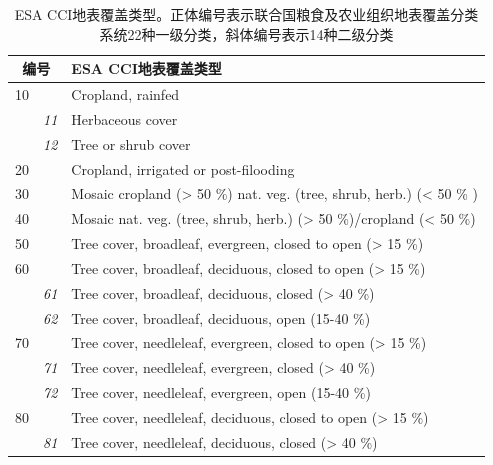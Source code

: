 \begin{table}[htbp]
  \centering
  \caption[ESA CCI地表覆盖类型]{ESA CCI地表覆盖类型。正体编号表示联合国粮食及农业组织地表覆盖分类系统22种一级分类，斜体编号表示14种二级分类}
  \label{tab:ESA覆盖类型}
  \begin{tabular}{lll}
    \toprule
    \multicolumn{2}{c}{编号} & ESA CCI地表覆盖类型 \\ \midrule
    10                       &                      & Cropland, rainfed                                                   \\
    & \textit{11}          & Herbaceous cover                                                    \\
    & \textit{12}          & Tree or shrub cover                                                 \\
    20                       &                      & Cropland, irrigated or post-filooding                               \\
    30                       &                      & Mosaic cropland (> 50 \%) nat. veg. (tree, shrub, herb.) (< 50 \% ) \\
    40                       &                      & Mosaic nat. veg. (tree, shrub, herb.) (> 50 \%)/cropland (< 50 \%)  \\
    50                       &                      & Tree cover, broadleaf, evergreen, closed to open (> 15 \%)          \\
    60                       &                      & Tree cover, broadleaf, deciduous, closed to open (> 15 \%)          \\
    & \textit{61}          & Tree cover, broadleaf, deciduous, closed (> 40 \%)                  \\
    & \textit{62}          & Tree cover, broadleaf, deciduous, open (15-40 \%)                   \\
    70                       &                      & Tree cover, needleleaf, evergreen, closed to open (> 15 \%)         \\
    & \textit{71}          & Tree cover, needleleaf, evergreen, closed (> 40 \%)                 \\
    & \textit{72}          & Tree cover, needleleaf, evergreen, open (15-40 \%)                  \\
    80                       &                      & Tree cover, needleleaf, deciduous, closed to open (> 15 \%)         \\
    & \textit{81}          & Tree cover, needleleaf, deciduous, closed (> 40 \%)                 \\

\end{tabular}
\end{table}
